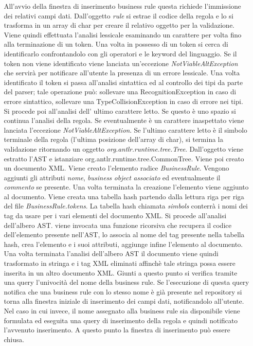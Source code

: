 \documentclass[11pt,titlepage,a4paper]{report}
\begin{document}
All'avvio della finestra di inserimento business rule questa richiede l'immissione dei relativi campi dati. Dall'oggetto \textit{rule} si estrae il codice della regola e lo si trasforma in un array di char per creare il relativo oggetto per la validazione. Viene quindi effettuata l'analisi lessicale esaminando un carattere per volta fino alla terminazione di un token. Una volta in possesso di un token si cerca di identificarlo confrontandolo con gli operatori e le keyword del linguaggio. Se il token non viene identificato viene lanciata un'eccezione \textit{NotViableAltException} che servir\`a per notificare all'utente la presenza di un errore lessicale. Una volta identificato il token si passa all'analisi sintattica ed al controllo dei tipi da parte del parser; tale operazione pu\`o: sollevare una RecognitionException in caso di errore sintattico, sollevare una TypeCollisionException in caso di errore nei tipi. Si procede poi all'analisi dell' ultimo carattere letto. Se questo \`e uno spazio si continua l'analisi della regola. Se eventualmente \`e un carattere inaspettato viene lanciata l'eccezione \textit{NotViableAltException}. Se l'ultimo carattere letto \`e il simbolo terminale della regola (l'ultima posizione dell'array di char), si termina la validazione ritornando un oggetto \textit{org.antlr.runtime.tree.Tree}.
Dall'oggetto viene estratto l'AST e istanziare org.antlr.runtime.tree.CommonTree. Viene poi creato un documento XML. Viene creato l'elemento radice \textit{BusinessRule}. Vengono aggiunti gli attributi \textit{nome}, \textit{business object associato} ed eventualmente il \textit{commento} se presente. Una volta terminata la creazione l'elemento viene aggiunto al documento. Viene creata una tabella hash partendo dalla lettura riga per riga del file \textit{BusinessRule.tokens}. La tabella hash chiamata \textit{simbols} conterr\`a i nomi dei tag da usare per i vari elementi del documento XML. Si procede all'analisi dell'albero AST. viene invocata una funzione ricorsiva che recupera il codice dell'elemento presente nell'AST, lo associa al nome del tag presente nella tabella hash, crea l'elemento e i suoi attributi, aggiunge infine l'elemento al documento. Una volta terminata l'analisi dell'albero AST il documento viene quindi trasformato in stringa e i tag XML eliminati affinch\`e tale stringa possa essere inserita in un altro documento XML. Giunti a questo punto si verifica tramite una query l'univocit\`a del nome della business rule. Se l'esecuzione di questa query notifica che una business rule con lo stesso nome \`e gi\`a presente nel repository si torna alla finestra iniziale di inserimento dei campi dati, notificandolo all'utente. Nel caso in cui invece, il nome assegnato alla business rule sia disponibile viene formulata ed eseguita una query di inserimento della regola e quindi notificato l'avvenuto inserimento. A questo punto la finestra di inserimento pu\`o essere chiusa.
\end{document}
